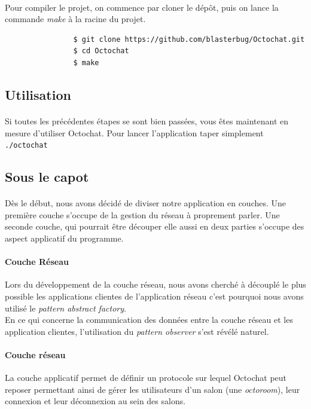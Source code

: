 \documentclass[a4paper]{article}
\begin{document}
			\paragraph{}{
				Pour compiler le projet, on commence par cloner le dépôt, puis on lance la commande \textit{make} à la racine du projet.
			}

			\begin{verbatim}
				$ git clone https://github.com/blasterbug/Octochat.git
				$ cd Octochat
				$ make
			\end{verbatim}

		\subsection{Utilisation}
			\paragraph{}{
			Si toutes les précédentes étapes se sont bien passées, vous êtes maintenant en mesure d'utiliser Octochat.
			Pour lancer l'application taper simplement \verb|./octochat|
			}

		\subsection{Sous le capot}
			\paragraph{}{
			Dès le début, nous avons décidé de diviser notre application en couches.
			Une première couche s'occupe de la gestion du réseau à proprement parler. Une seconde couche,
			qui pourrait être découper elle aussi en deux parties s'occupe des aspect applicatif du programme.
			}

			\paragraph{Couche Réseau}{
			Lors du développement de la couche réseau, nous avons cherché à découplé le plus possible les
			applications clientes de l’application réseau c’est pourquoi nous avons utilisé le \textit{pattern
			abstract factory}. \\
			En ce qui concerne la communication des données entre la couche réseau et les application clientes,
			l’utilisation du \textit{pattern observer} s’est révélé naturel.
			}

			\paragraph{Couche réseau}{
			La couche applicatif permet de définir un protocole sur lequel Octochat peut reposer permettant ainsi
			de gérer les utilisateurs d'un salon (une \textit{octoroom}), leur connexion et leur déconnexion au sein
			des salons.
			}
			
\end{document}
